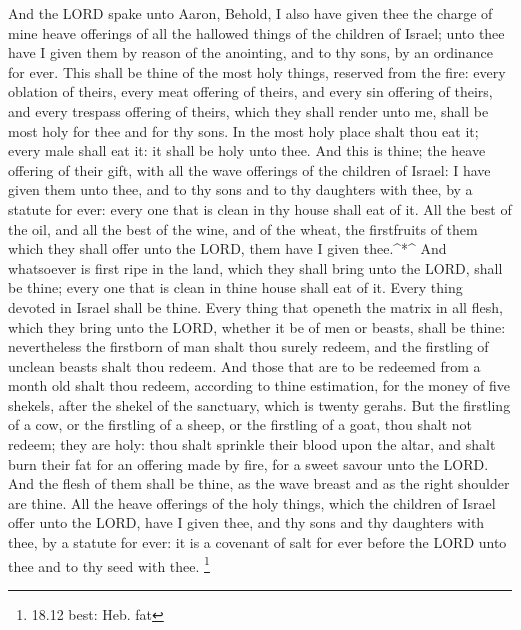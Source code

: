  And the LORD spake unto Aaron, Behold, I also have given
thee the charge of mine heave offerings of all the hallowed things of
the children of Israel; unto thee have I given them by reason of the
anointing, and to thy sons, by an ordinance for ever.  This
shall be thine of the most holy things, reserved from the fire: every
oblation of theirs, every meat offering of theirs, and every sin
offering of theirs, and every trespass offering of theirs, which they
shall render unto me, shall be most holy for thee and for thy sons.
 In the most holy place shalt thou eat it; every male shall
eat it: it shall be holy unto thee.  And this is thine; the
heave offering of their gift, with all the wave offerings of the
children of Israel: I have given them unto thee, and to thy sons and to
thy daughters with thee, by a statute for ever: every one that is clean
in thy house shall eat of it.  All the best of the oil, and
all the best of the wine, and of the wheat, the firstfruits of them
which they shall offer unto the LORD, them have I given thee.\^{}*\^{}
 And whatsoever is first ripe in the land, which they shall
bring unto the LORD, shall be thine; every one that is clean in thine
house shall eat of it.  Every thing devoted in Israel shall
be thine.  Every thing that openeth the matrix in all
flesh, which they bring unto the LORD, whether it be of men or beasts,
shall be thine: nevertheless the firstborn of man shalt thou surely
redeem, and the firstling of unclean beasts shalt thou redeem.
 And those that are to be redeemed from a month old shalt
thou redeem, according to thine estimation, for the money of five
shekels, after the shekel of the sanctuary, which is twenty gerahs.
 But the firstling of a cow, or the firstling of a sheep,
or the firstling of a goat, thou shalt not redeem; they are holy: thou
shalt sprinkle their blood upon the altar, and shalt burn their fat for
an offering made by fire, for a sweet savour unto the LORD.
 And the flesh of them shall be thine, as the wave breast
and as the right shoulder are thine.  All the heave
offerings of the holy things, which the children of Israel offer unto
the LORD, have I given thee, and thy sons and thy daughters with thee,
by a statute for ever: it is a covenant of salt for ever before the LORD
unto thee and to thy seed with thee. \footnote{18.12 best: Heb. fat}

